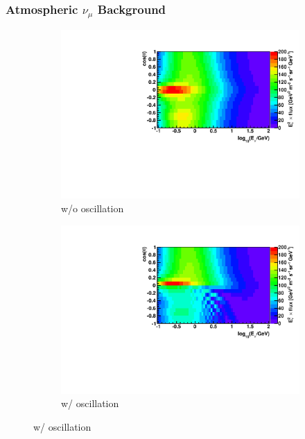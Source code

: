 \documentclass{beamer}
\begin{document}
\begin{frame}
	\frametitle{Atmospheric $\nu_{\mu}$ Background}
	\begin{figure}
		\centering
		\begin{subfigure}[b]{0.49\linewidth}
			\caption*{ w/o oscillation }
			\includegraphics[width=\linewidth]{atm_numu_hist.pdf}
		\end{subfigure}
		\begin{subfigure}[b]{0.49\linewidth}
			\caption*{ w/ oscillation }
			\includegraphics[width=\linewidth]{atm_numu_osc_hist.pdf}
		\end{subfigure}
	\end{figure}
\end{frame}
\end{document}
